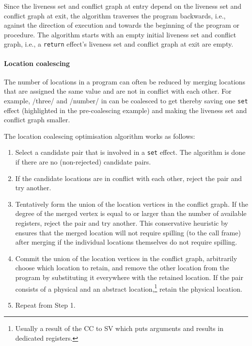\documentclass[main.tex]{subfiles}
\begin{document}
Since the liveness set and conflict graph at entry depend on the liveness set and conflict graph at exit, the algorithm traverses the program backwards, i.e., against the direction of execution and towards the beginning of the program or procedure. The algorithm starts with an empty initial liveness set and conflict graph, i.e., a \texttt{return} effect's liveness set and conflict graph at exit are empty.

\paragraph{Location coalescing} The number of locations in a program can often be reduced by merging locations that are assigned the same value and are not in conflict with each other. For example, \iil/three/ and \iil/number/ in
can be coalesced to get
thereby saving one \texttt{set} effect (highlighted in the pre-coalescing example) and making the liveness set and conflict graph smaller.

The location coalescing optimisation algorithm works as follows:
\begin{enumerate}
	\item Select a candidate pair that is involved in a \texttt{set} effect. The algorithm is done if there are no (non-rejected) candidate pairs.
	\item If the candidate locations are in conflict with each other, reject the pair and try another.
	\item Tentatively form the union of the location vertices in the conflict graph. If the degree of the merged vertex is equal to or larger than the number of available registers, reject the pair and try another. This conservative heuristic by \citet{briggs} ensures that the merged location will not require spilling (to the call frame) after merging if the individual locations themselves do not require spilling.
	\item Commit the union of the location vertices in the conflict graph, arbitrarily choose which location to retain, and remove the other location from the program by substituting it everywhere with the retained location. If the pair consists of a physical and an abstract location,\footnote{Usually a result of the CC to SV  which puts arguments and results in dedicated registers.} retain the physical location.
	\item Repeat from Step 1.
\end{enumerate}
\end{document}
